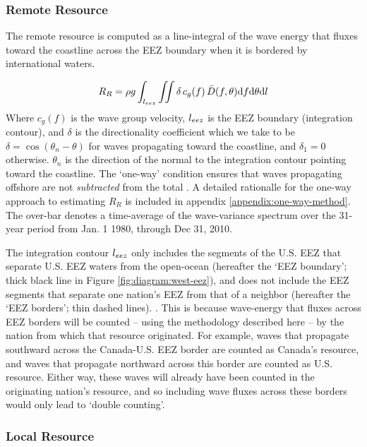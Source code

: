 \subsubsection{Remote Resource} \label{sec:method:calc:remote}

The remote resource is computed as a line-integral of the wave energy that fluxes toward the coastline across the EEZ boundary when it is bordered by international waters. 

\begin{align}
  R_R = \rho g \int_{l_{eez}}\iint \delta \, c_g(f) \, \bar{D}(f,\theta) \mathrm{d} f \mathrm{d} \theta \mathrm{d} l
\label{eqn:RR}
\end{align}
Where $c_g(f)$ is the wave group velocity, $l_{eez}$ is the EEZ boundary (integration contour), and $\delta$ is the directionality coefficient which we take to be $\delta = \cos(\theta_n - \theta)$ for waves propagating toward the coastline, and $\delta_1 = 0$ otherwise. $\theta_n$ is the direction of the normal to the integration contour pointing toward the coastline. The `one-way' condition ensures that waves propagating offshore are not {\em subtracted} from the total \citep[]{gunnQuantifyingGlobalWave2012}. A detailed rationalle for the one-way approach to estimating $R_R$ is included in appendix \ref{appendix:one-way-method}. The over-bar denotes a time-average of the wave-variance spectrum over the 31-year period from Jan. 1 1980, through Dec 31, 2010.

The integration contour $l_{eez}$ only includes the segments of the U.S. EEZ that separate U.S. EEZ waters from the open-ocean (hereafter the `EEZ boundary'; thick black line in Figure \ref{fig:diagram:west-eez}), and does not include the EEZ segments that separate one nation's EEZ from that of a neighbor (hereafter the `EEZ borders'; thin dashed lines). \citep[]{flandersmarineinstituteMaritimeBoundariesGeodatabase2018}. This is because wave-energy that fluxes across EEZ borders will be counted -- using the methodology described here -- by the nation from which that resource originated. For example, waves that propagate southward across the Canada-U.S. EEZ border are counted as Canada's resource, and waves that propagate northward across this border are counted as U.S. resource. Either way, these waves will already have been counted in the originating nation's resource, and so including wave fluxes across these borders would only lead to `double counting'.


\subsubsection{Local Resource} \label{sec:method:calc:local}


